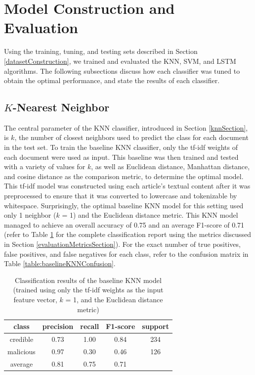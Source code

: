 \section{Model Construction and Evaluation} \label{modelConstruction}

Using the training, tuning, and testing sets described in Section \ref{datasetConstruction}, we trained and evaluated the KNN, SVM, and LSTM algorithms.  The following subsections discuss how each classifier was tuned to obtain the optimal performance, and state the results of each classifier.


\subsection{$K$-Nearest Neighbor} \label{KNNResults}

The central parameter of the KNN classifier, introduced in Section \ref{knnSection}, is $k$, the number of closest neighbors used to predict the class for each document in the test set.  To train the baseline KNN classifier, only the tf-idf weights of each document were used as input.  This baseline was then trained and tested with a variety of values for $k$, as well as Euclidean distance, Manhattan distance, and cosine distance as the comparison metric, to determine the optimal model.  This tf-idf model was constructed using each article's textual content after it was preprocessed to ensure that it was converted to lowercase and tokenizable by whitespace.  Surprisingly, the optimal baseline KNN model for this setting used only 1 neighbor ($k$ = 1) and the Euclidean distance metric.  This KNN model managed to achieve an overall accuracy of 0.75 and an average F1-score of 0.71 (refer to Table \ref{table:baselineKNN} for the complete classification report using the metrics discussed in Section \ref{evaluationMetricsSection}).  For the exact number of true positives, false positives, and false negatives for each class, refer to the confusion matrix in Table \ref{table:baselineKNNConfusion}.


\begin{table}[h!]
\centering
\begin{tabular}{|c | c  c  c | c|}
\hline
class      & precision & recall & F1-score & support\\
\hline
credible   & 0.73      & 1.00   & 0.84     & 234    \\
malicious  & 0.97      & 0.30   & 0.46     & 126    \\
\hline
average    & 0.81      & 0.75   & 0.71     &   \\
\hline
\end{tabular}
\caption[Baseline KNN's Classification Report]{Classification results of the baseline KNN model (trained using only the tf-idf weights as the input feature vector, $k$ = 1, and the Euclidean distance metric)}
\label{table:baselineKNN}
\end{table}



